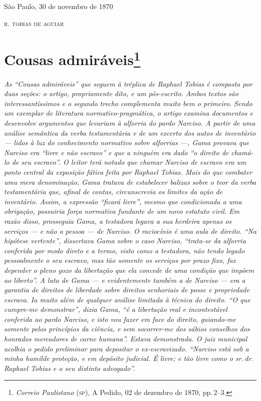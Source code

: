 \begin{flushright}
São Paulo, 30 de novembro de 1870

\textsc{r. tobias de aguiar}
\end{flushright}

\chapter{Cousas admiráveis\footnote{\emph{Correio Paulistano} (\textsc{sp}), A Pedido, 02 de dezembro de 1870,
  pp.\,2--3.}} %

\begin{didascalia}
\emph{As ``Cousas admiráveis'' que seguem à tréplica de Raphael Tobias é
composta por duas seções: o artigo, propriamente dito, e um pós-escrito.
Ambos textos são interessantíssimos e o segundo trecho complementa muito
bem o primeiro. Sendo um exemplar de literatura normativo-pragmática, o
artigo examina documentos e desenvolve argumentos que levariam à
alforria do pardo Narciso. A partir de uma análise semântica da verba
testamentária e de um excerto dos autos de inventário --- lidos à luz do
conhecimento normativo sobre alforrias ---, Gama provava que Narciso era
``livre e não escravo'' e que a ninguém era dado ``o direito de chamá-lo de
seu escravo''. O leitor terá notado que chamar Narciso de escravo era um
ponto central da exposição fática feita por Raphael Tobias. Mais do que
combater uma mera denominação, Gama tratava de estabelecer balizas sobre
o teor da verba testamentária que, afinal de contas, circunscrevia os
limites da ação de inventário. Assim, a expressão ``ficará livre'', mesmo
que condicionada a uma obrigação, possuiria força normativa fundante de
um novo estatuto civil. Em razão disso, prosseguia Gama, a testadora
legava a sua herdeira apenas os serviços --- e não a pessoa --- de Narciso.
O raciocínio é uma aula de direito. ``Na hipótese vertente'', dissertava
Gama sobre o caso Narciso, ``trata-se da alforria conferida por modo
direto e a termo, visto como a testadora, não tendo legado pessoalmente
o seu escravo, mas tão somente os serviços por prazo fixo, faz depender
o pleno gozo da libertação que ela concede de uma condição que impõem ao
liberto''. A luta de Gama --- e evidentemente também a de Narciso --- era a
garantia de direitos de liberdade sobre direitos senhoriais de posse e
propriedade escrava. Ia muito além de qualquer análise limitada à
técnica do direito. ``O que cumpre-me demonstrar'', dizia Gama, ``é a
libertação real e incontestável conferida ao pardo Narciso, e isto vou
fazer em face do direito, guiando-me somente pelos princípios da
ciência, e sem socorrer-me dos sábios conselhos dos honrados mercadores
de carne humana''. Estava demonstrada. O juiz municipal acolhia o pedido
preliminar para depositar o ex-escravizado. ``Narciso está sob a minha
humilde proteção, e em depósito judicial. É livre; e tão livre como o
sr.\,dr.\,Raphael Tobias e o seu distinto advogado''.}
\end{didascalia}

